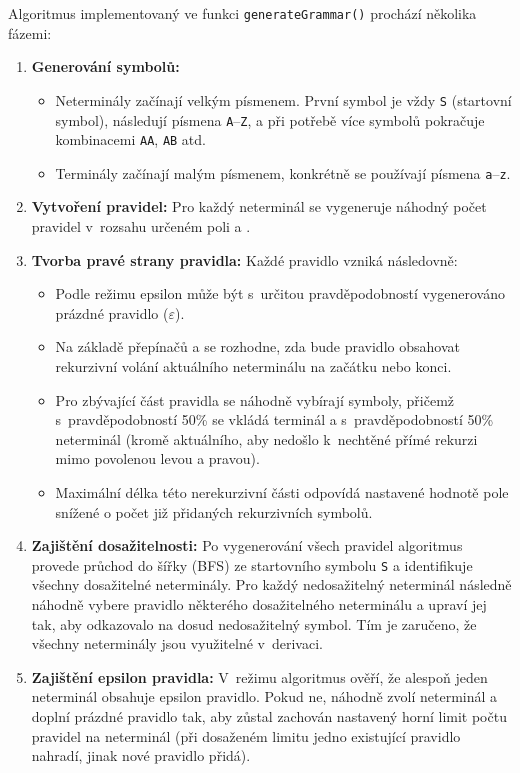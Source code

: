 Algoritmus implementovaný ve funkci \texttt{generateGrammar()} prochází několika fázemi:

\begin{enumerate}
    \item \textbf{Generování symbolů:} 
    \begin{itemize}
        \item Neterminály začínají velkým písmenem. První symbol je vždy \texttt{S} (startovní symbol), následují písmena \texttt{A}--\texttt{Z}, a při potřebě více symbolů pokračuje kombinacemi \texttt{AA}, \texttt{AB} atd.
        \item Terminály začínají malým písmenem, konkrétně se používají písmena \texttt{a}--\texttt{z}.
    \end{itemize}
    
    \item \textbf{Vytvoření pravidel:} Pro každý neterminál se vygeneruje náhodný počet pravidel v~rozsahu určeném poli  a .
    
    \item \textbf{Tvorba pravé strany pravidla:} Každé pravidlo vzniká následovně:
    \begin{itemize}
        \item Podle režimu epsilon může být s~určitou pravděpodobností vygenerováno prázdné pravidlo ($\varepsilon$).
        \item Na základě přepínačů  a  se rozhodne, zda bude pravidlo obsahovat rekurzivní volání aktuálního neterminálu na začátku nebo konci.
        \item Pro zbývající část pravidla se náhodně vybírají symboly, přičemž s~pravděpodobností 50\% se vkládá terminál a s~pravděpodobností 50\% neterminál (kromě aktuálního, aby nedošlo k~nechtěné přímé rekurzi mimo povolenou levou a pravou).
        \item Maximální délka této nerekurzivní části odpovídá nastavené hodnotě pole  snížené o počet již přidaných rekurzivních symbolů.
    \end{itemize}
    
    \item \textbf{Zajištění dosažitelnosti:} Po vygenerování všech pravidel algoritmus provede průchod do šířky (BFS) ze startovního symbolu \texttt{S} a identifikuje všechny dosažitelné neterminály. Pro každý nedosažitelný neterminál následně náhodně vybere pravidlo některého dosažitelného neterminálu a upraví jej tak, aby odkazovalo na dosud nedosažitelný symbol. Tím je zaručeno, že všechny neterminály jsou využitelné v~derivaci.
    
    \item \textbf{Zajištění epsilon pravidla:} V~režimu  algoritmus ověří, že alespoň jeden neterminál obsahuje epsilon pravidlo. Pokud ne, náhodně zvolí neterminál a doplní prázdné pravidlo tak, aby zůstal zachován nastavený horní limit počtu pravidel na neterminál (při dosaženém limitu jedno existující pravidlo nahradí, jinak nové pravidlo přidá).
\end{enumerate}

